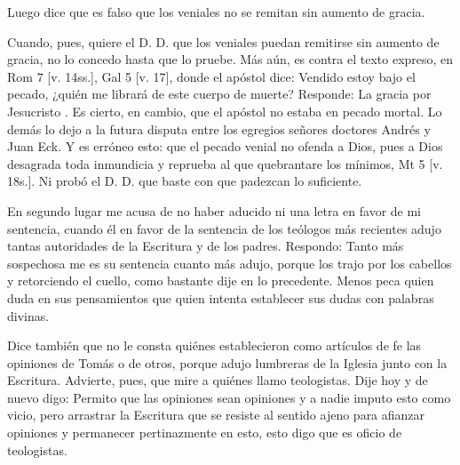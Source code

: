Luego dice que es falso que los veniales no se remitan sin aumento de gracia.

Cuando, pues, quiere el D. D. que los veniales puedan remitirse sin aumento de gracia, no lo concedo hasta que lo pruebe. Más aún, es contra el texto expreso, en Rom 7 [v. 14ss.], Gal 5 [v. 17], donde el apóstol dice: Vendido estoy bajo el pecado, ¿quién me librará de este cuerpo de muerte? Responde: La gracia por Jesucristo \marginpar{\small[339]}. Es cierto, en cambio, que el apóstol no estaba en pecado mortal. Lo demás lo dejo a la futura disputa entre los egregios señores doctores Andrés y Juan Eck. Y es erróneo esto: que el pecado venial no ofenda a Dios, pues a Dios desagrada toda inmundicia y reprueba al que quebrantare los mínimos, Mt 5 [v. 18s.]. Ni probó el D. D. que baste con que padezcan lo suficiente.

En segundo lugar me acusa de no haber aducido ni una letra en favor de mi sentencia, cuando él en favor de la sentencia de los teólogos más recientes adujo tantas autoridades de la Escritura y de los padres. Respondo: Tanto más sospechosa me es su sentencia cuanto más adujo, porque los trajo por los cabellos y retorciendo el cuello, como bastante dije en lo precedente. Menos peca quien duda en sus pensamientos que quien intenta establecer sus dudas con palabras divinas.

Dice también que no le consta quiénes establecieron como artículos de fe las opiniones de Tomás o de otros, porque adujo lumbreras de la Iglesia junto con la Escritura. Advierte, pues, que mire a quiénes llamo teologistas. Dije hoy y de nuevo digo: Permito que las opiniones sean opiniones y a nadie imputo esto como vicio, pero arrastrar la Escritura que se resiste al sentido ajeno para afianzar opiniones y permanecer pertinazmente en esto, esto digo que es oficio de teologistas.


